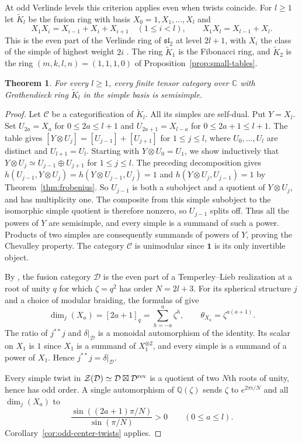 \documentclass[11pt,reqno]{amsart}
\newtheorem{theorem}{Theorem}[section]
\theoremstyle{definition}
\newcommand{\one}{\mathbf 1}
\newcommand{\C}{\mathcal C}
\newcommand{\CC}{\mathbb C}
\begin{document}
At odd Verlinde levels this criterion applies even when twists coincide. For $l\geq1$ let $\widetilde K_l$ be the fusion ring with basis $X_0=1,X_1,\ldots,X_l$ and
\[
 X_1X_i=X_{i-1}+X_i+X_{i+1}\quad(1\leq i<l),\qquad X_1X_l=X_{l-1}+X_l .
\]
This is the even part of the Verlinde ring of $\mathfrak{sl}_2$ at level $2l+1$, with $X_i$ the class of the simple of highest weight $2i$ \cite[Example~4.10.6]{EGNO}. The ring $\widetilde K_1$ is the Fibonacci ring, and $\widetilde K_2$ is the ring $(m,k,l,n)=(1,1,1,0)$ of Proposition~\ref{prop:small-tables}.

\begin{theorem}\label{thm:verlinde}
For every $l\geq 1$, every finite tensor category over $\CC$ with Grothendieck ring $\widetilde K_l$ in the simple basis is semisimple.
\end{theorem}

\begin{proof}
Let $\C$ be a categorification of $\widetilde K_l$. All its simples are self-dual. Put $Y=X_l$. Set $U_{2a}=X_a$ for $0\leq 2a\leq l+1$ and $U_{2a+1}=X_{l-a}$ for $0\leq 2a+1\leq l+1$. The table gives $[Y\otimes U_j]=[U_{j-1}]+[U_{j+1}]$ for $1\leq j\leq l$, where $U_0,\ldots,U_l$ are distinct and $U_{l+1}=U_l$. Starting with $Y\otimes U_0=U_1$, we show inductively that $Y\otimes U_j\simeq U_{j-1}\oplus U_{j+1}$ for $1\le j\le l$. The preceding decomposition gives $h(U_{j-1},Y\otimes U_j)=h(Y\otimes U_{j-1},U_j)=1$ and $h(Y\otimes U_j,U_{j-1})=1$ by Theorem~\ref{thm:frobenius}. So $U_{j-1}$ is both a subobject and a quotient of $Y\otimes U_j$, and has multiplicity one. The composite from this simple subobject to the isomorphic simple quotient is therefore nonzero, so $U_{j-1}$ splits off. Thus all the powers of $Y$ are semisimple, and every simple is a summand of such a power. Products of two simples are consequently summands of powers of $Y$, proving the Chevalley property. The category $\C$ is unimodular since $\one$ is its only invertible object.

By \cite[Remark~A.4(iii)]{EOsemi}, the fusion category $\mathcal D$ is the even part of a Temperley--Lieb realization at a root of unity $q$ for which $\zeta=q^2$ has order $N=2l+3$. For its spherical structure $j$ and a choice of modular braiding, the formulas of \cite[\S\S1--2]{EMfield} give
\[
  \dim_j(X_a)=[2a+1]_q=\sum_{h=-a}^a\zeta^h,\qquad
  \theta_{X_a}=\zeta^{a(a+1)}.
\]
 The ratio of $j^{**}j$ and $\delta|_{\mathcal D}$ is a monoidal automorphism of the identity. Its scalar on $X_1$ is $1$ since $X_1$ is a summand of $X_1^{\otimes 2}$, and every simple is a summand of a power of $X_1$. Hence $j^{**}j=\delta|_{\mathcal D}$.

Every simple twist in $\mathcal Z(\mathcal D)\simeq\mathcal D\boxtimes\mathcal D^{\rm rev}$ is a quotient of two $N$th roots of unity, hence has odd order. A single automorphism of $\mathbb Q(\zeta)$ sends $\zeta$ to $e^{2\pi i/N}$ and all $\dim_j(X_a)$ to
\[
 \frac{\sin((2a+1)\pi/N)}{\sin(\pi/N)}>0\qquad(0\leq a\leq l).
\]
Corollary~\ref{cor:odd-center-twists} applies.
\end{proof}
\end{document}
